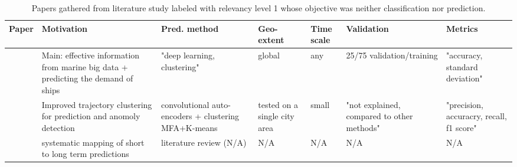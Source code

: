 
\noindent
\begin{table}[t]
{\small\begin{tabularx}{1.2\textwidth}{p{0.6in} X X p{0.5in} p{0.4in} X p{0.5in}}
    \toprule
    \textbf{Paper} & \textbf{Motivation} & \textbf{Pred. method} & \textbf{Geo-extent} & \textbf{Time scale} & \textbf{Validation} & \textbf{Metrics} \\ \midrule
    \cite{Hamada2021DevelopmentPlanning} & Main: effective information from marine big data + predicting the demand of ships & "deep learning, clustering" & global & any & 25/75 validation/training & "accuracy, standard deviation" \\ \midrule
    \cite{Wang2021AISAuto-encoder} & Improved trajectory clustering for prediction and anomoly detection & convolutional auto-encoders + clustering MFA+K-means & tested on a single city area & small & "not explained, compared to other methods" & "precision, accuracry, recall, f1 score" \\ \midrule
    \cite{Dobrkovic2015TowardsTimes} & systematic mapping of short to long term predictions & literature review (N/A) & N/A & N/A & N/A & N/A \\ \bottomrule
\end{tabularx}}
\caption{Papers gathered from literature study labeled with relevancy level 1 whose objective was neither classification nor prediction.}
\label{tab:lit_review_cat_1_4}
\end{table}


